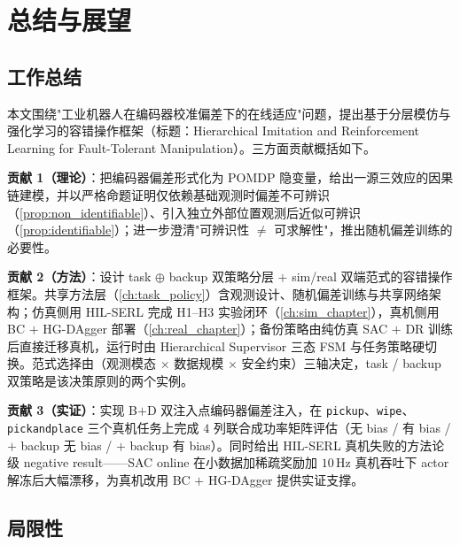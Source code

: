 
\chapter{总结与展望}\label{ch:conclusion}

\section{工作总结}\label{sec:summary}

本文围绕"工业机器人在编码器校准偏差下的在线适应"问题，提出基于分层模仿与强化学习的容错操作框架（标题：Hierarchical Imitation and Reinforcement Learning for Fault-Tolerant Manipulation）。三方面贡献概括如下。

\textbf{贡献 1（理论）}：把编码器偏差形式化为 POMDP 隐变量，给出一源三效应的因果链建模，并以严格命题证明仅依赖基础观测时偏差不可辨识（\cref{prop:non_identifiable}）、引入独立外部位置观测后近似可辨识（\cref{prop:identifiable}）；进一步澄清"可辨识性 $\neq$ 可求解性"，推出随机偏差训练的必要性。

\textbf{贡献 2（方法）}：设计 task $\oplus$ backup 双策略分层 $+$ sim/real 双端范式的容错操作框架。共享方法层（\cref{ch:task_policy}）含观测设计、随机偏差训练与共享网络架构；仿真侧用 HIL-SERL 完成 H1–H3 实验闭环（\cref{ch:sim_chapter}），真机侧用 BC $+$ HG-DAgger 部署（\cref{ch:real_chapter}）；备份策略由纯仿真 SAC $+$ DR 训练后直接迁移真机，运行时由 Hierarchical Supervisor 三态 FSM 与任务策略硬切换。范式选择由（观测模态 $\times$ 数据规模 $\times$ 安全约束）三轴决定，task / backup 双策略是该决策原则的两个实例。

\textbf{贡献 3（实证）}：实现 B$+$D 双注入点编码器偏差注入，在 \texttt{pickup}、\texttt{wipe}、\texttt{pickandplace} 三个真机任务上完成 $4$ 列联合成功率矩阵评估（无 bias / 有 bias / $+$ backup 无 bias / $+$ backup 有 bias）。同时给出 HIL-SERL 真机失败的方法论级 negative result——SAC online 在小数据加稀疏奖励加 $10$\,Hz 真机吞吐下 actor 解冻后大幅漂移，为真机改用 BC $+$ HG-DAgger 提供实证支撑。

\section{局限性}\label{sec:limitations}

